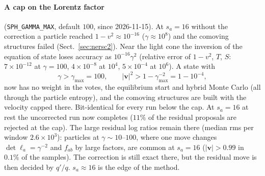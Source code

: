 \documentclass[11pt,aps,preprint,nofootinbib,superscriptaddress,tightenlines]{revtex4-2}
\def\st{\begin{equation}}
\def\stp{\end{equation}}
\def\Sect#1{Sect.~\ref{#1}}
\let\oldparagraph\paragraph
\renewcommand{\paragraph}{\par\bigskip\oldparagraph}
\begin{document}
\paragraph{A cap on the Lorentz factor} (\texttt{SPH\_GAMMA\_MAX}, default $100$, since 2026-11-15).  At $s_a=16$ without the correction a particle
reached $1-v^2\approx10^{-16}$ ($\gamma\approx10^8$) and the comoving structures failed (\Sect{sec:nersc2}).  Near the light cone the inversion of the
equation of state loses accuracy as $10^{-16}\gamma^2$ (relative error of $1-v^2$, $T$, $S$: $7\times10^{-12}$ at $\gamma=100$, $4\times10^{-8}$ at $10^4$,
$5\times10^{-4}$ at $10^6$).  A state with
\st
\gamma>\gamma_{\max}=100,\qquad |\bm v|^2>1-\gamma_{\max}^{-2}=1-10^{-4},
\stp
now has no weight in the votes, the equilibrium start and hybrid Monte Carlo (all through the particle entropy), and the comoving
structures are built with the velocity capped there.  Bit-identical for every run below the cap.  At $s_a=16$ at rest the uncorrected run
now completes ($11\%$ of the residual proposals are rejected at the cap).  The large residual log ratios remain there (median rms per
window $2.6\times10^3$): particles at $\gamma\sim10$--$100$, where one move changes $\det\ell_a=\gamma^{-2}$ and $f_{ab}$ by large factors, are common at
$s_a=16$ ($|\bm v|>0.99$ in $0.1\%$ of the samples).  The correction is still exact there, but the residual move is then decided by $q'/q$.
$s_a\approx16$ is the edge of the method.
\end{document}
